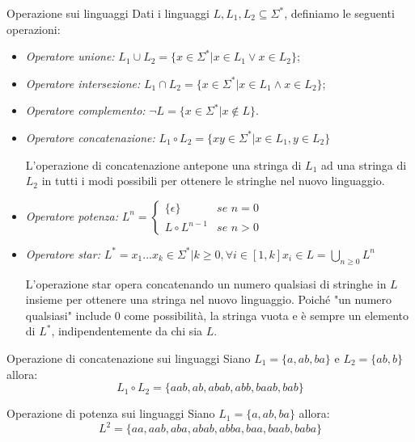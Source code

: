 \begin{Definition}{Operazione sui linguaggi}{}
    Dati i linguaggi $L, L_1, L_2 \subseteq \Sigma^*$, definiamo le seguenti operazioni:
    \begin{itemize}
        \item \textit{Operatore unione:} $L_1 \cup L_2 = \{x \in \Sigma^*| x \in L_1 \lor x \in L_2\}$;
        \item \textit{Operatore intersezione:} $L_1 \cap L_2 = \{x \in \Sigma^* | x \in L_1 \land x \in L_2\}$;
        \item \textit{Operatore complemento:} $\lnot L = \{x \in \Sigma^* | x \notin L\}$.
        \item \textit{Operatore concatenazione:} $L_1 \circ L_2 = \{xy \in \Sigma^*| x \in L_1, y \in L_2\}$

        L'operazione di concatenazione antepone una stringa di $L_1$ ad una stringa di $L_2$ in tutti i modi possibili per ottenere le stringhe nel nuovo linguaggio.
        \item \textit{Operatore potenza:} $L^n = \begin{cases}
            \{\epsilon\}&\textit{se } n = 0\\L\circ L^{n-1}&\textit{se } n > 0\end{cases}$
        \item \textit{Operatore star:} $L^* = {x_1 ... x_k \in \Sigma^*| k \geq 0, \forall i \in [1, k] x_i \in L} = \bigcup_{n\geq0} L^n$

        L'operazione star opera concatenando un numero qualsiasi di stringhe in $L$ insieme per ottenere una stringa nel nuovo linguaggio. Poiché "un numero qualsiasi" include 0 come possibilità, la stringa vuota e è sempre un elemento di $L^*$, indipendentemente da chi sia $L$.
    \end{itemize}
\end{Definition}

\begin{Example}{Operazione di concatenazione sui linguaggi}{}
    Siano $L_1=\{a, ab, ba\}$ e $L_2=\{ab, b\}$ allora:
    \begin{equation*}
        L_1\circ L_2 = \{aab, ab, abab, abb, baab, bab\}
    \end{equation*}
\end{Example}

\begin{Example}{Operazione di potenza sui linguaggi}{}
    Siano $L_1=\{a, ab, ba\}$ allora:
    \begin{equation*}
        L^2=\{aa, aab, aba, abab, abba, baa, baab, baba\}
    \end{equation*}
\end{Example}

